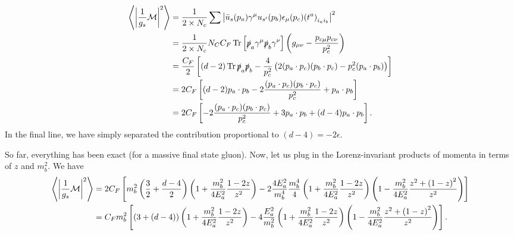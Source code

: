 \begin{subappendices}
\begin{align}
    \left\langle
        \left|\frac{1}{g_s} \mathcal{M} \right|^2
    \right\rangle
    &=
    \frac{1}{2 \times N_c}
    \sum \left|
        \bar{u}_s(p_a) \gamma^\mu u_{s'}(p_b)
        \epsilon_\mu(p_c)
        {(t^a)}_{i_a i_b}
    \right|^2
    \\
    &=
    \frac{1}{2 \times N_c}
    N_C C_F
    \Tr\left[
        \slashed{p}_a \gamma^\mu \slashed{p}_b \gamma^\nu
    \right]
    \left(
        g_{\mu\nu} - \frac{p_{c\mu} p_{c\nu}}{p_c^2}
    \right)
    \\
    &=
    \frac{C_F}{2}
    \left[
        (d-2) \Tr \slashed{p}_a \slashed{p}_b
        -
        \frac{4}{p_c^2}
        \left(
            2 (p_a \cdot p_c) (p_b \cdot p_c)
            -
            p_c^2 (p_a \cdot p_b)
        \right)
    \right]
    \\
    &=
    2 C_F \left[
        (d-2) p_a \cdot p_b
        -
        2 \frac{(p_a \cdot p_c) (p_b \cdot p_c)}{p_c^2}
        + p_a \cdot p_b
    \right]
    \\
    &=
    2 C_F \left[
        -
        2 \frac{(p_a \cdot p_c) (p_b \cdot p_c)}{p_c^2}
        +
        3 p_a \cdot p_b
        +
        (d-4) p_a \cdot p_b
    \right]
    .
\end{align}
In the final line, we have simply separated the contribution proportional to \((d-4) = -2 \epsilon\).

So far, everything has been exact (for a massive final state gluon). Now, let us plug in the Lorenz-invariant products of momenta in terms of \(z\) and \(m_b^2\). We have
\begin{align}
    \left\langle
        \left|\frac{1}{g_s} \mathcal{M} \right|^2
    \right\rangle
    &=
    2 C_F
    \left[
        m_b^2
        \left(\frac{3}{2} + \frac{d-4}{2}\right)
        \left(
            1
            +
            \frac{m_b^2}{4 E_a^2}
            \frac{1 - 2 z}{z^2}
        \right)
        -
        2
        \frac{4 E_a^2}{m_b^4}
        \frac{m_b^4}{4}
        \left(
            1
            +
            \frac{m_b^2}{4 E_a^2}
            \frac{1 - 2 z}{z^2}
        \right)
        \left(
            1
            -
            \frac{m_b^2}{4 E_a^2}
            \frac{z^2 + {(1-z)}^2}{z^2}
        \right)
    \right]
    \\
    &=
    \notag
    C_F m_b^2
    \left[
        \left(3 + (d-4)\right)
        \left(
            1
            +
            \frac{m_b^2}{4 E_a^2}
            \frac{1 - 2 z}{z^2}
        \right)
        -
        4
        \frac{E_a^2}{m_b^2}
        \left(
            1
            +
            \frac{m_b^2}{4 E_a^2}
            \frac{1 - 2 z}{z^2}
        \right)
        \left(
            1
            -
            \frac{m_b^2}{4 E_a^2}
            \frac{z^2 + {(1-z)}^2}{z^2}
        \right)
    \right]
    .
\end{align}


\end{subappendices}
